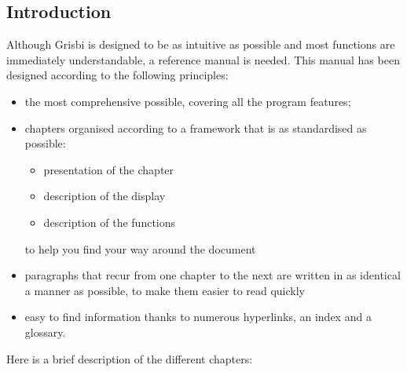 \subsection{Introduction \label{introduction-manual-presentation}}

Although Grisbi is designed to be as intuitive as possible and most functions are immediately understandable, a reference manual is needed. This manual has been designed according to the following principles:

\begin{itemize}
	\item the most comprehensive possible, covering all the program features;
	\item chapters organised according to a framework that is as standardised as possible:
		\begin{itemize}
			\item[\textopenbullet] presentation of the chapter
			\item[\textopenbullet] description of the display
			\item[\textopenbullet] description of the functions
		\end{itemize}
		to help you find your way around the document	 
	\item paragraphs that recur from one chapter to the next are written in as identical a manner as possible, to make them easier to read quickly
	\item easy to find information thanks to numerous \gls{hyperlinks}, an index and a glossary.
\end{itemize}



Here is a brief description of the different chapters:

